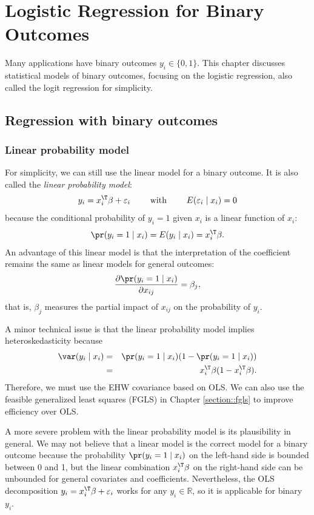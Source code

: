  
\chapter{Logistic Regression for Binary Outcomes}
 \label{chapter::binary-logit}

Many applications have binary outcomes $y_i \in \{0, 1\}$. This chapter discusses statistical models of binary outcomes, focusing on the logistic regression, also called the logit regression for simplicity. 


\section{Regression with binary outcomes}



\subsection{Linear probability model}

For simplicity, we can still use the linear model for a binary outcome. It is also called the {\it linear probability model}:
\[
y_{i}=x_{i}^{\T}\beta+\varepsilon_{i} \qquad \textup{ with } \qquad  E(\varepsilon_{i}\mid x_{i})=0
\]
because the conditional probability of $y_{i} = 1$ given $x_{i}$ is
a linear function of $x_{i}$: 
\[
\pr(y_{i}=1\mid x_{i})=E(y_{i}\mid x_{i})=x_{i}^{\T}\beta.
\]
An advantage of this linear model is  that the interpretation of the coefficient remains the same as linear models for general outcomes:
$$
\frac{ \partial  \pr(y_{i}=1\mid x_{i})  }{  \partial x_{ij} } = \beta_j,
$$
that is, $\beta_j$ measures the partial impact of $x_{ij}$ on the probability of $y_i$. 


A minor technical issue is that the linear probability model implies heteroskedasticity because
\begin{eqnarray*}
\var(y_i\mid x_i) 
&=& \pr(y_{i}=1\mid x_{i}) (1- \pr(y_{i}=1\mid x_{i})) \\
&=& x_{i}^{\T}\beta (1-x_{i}^{\T}\beta).
\end{eqnarray*}
Therefore, we must use the EHW covariance based on OLS. We can also use the feasible generalized least squares (FGLS) in Chapter \ref{section::fgls} to improve efficiency over OLS. 


A more severe problem with the linear probability model is its plausibility in general. We may not believe that a linear model is the correct model for a binary outcome because the probability $\pr(y_{i}=1\mid x_{i})$ on the left-hand side is bounded between 0 and 1, but the linear combination $x_{i}^{\T}\beta$ on the right-hand side can be unbounded for general covariates and coefficients. Nevertheless, the OLS decomposition $y_{i}=x_{i}^{\T}\beta+\varepsilon_{i}$
works for any $y_{i}\in\mathbb{R}$, so it is applicable for binary
$y_i$. 


